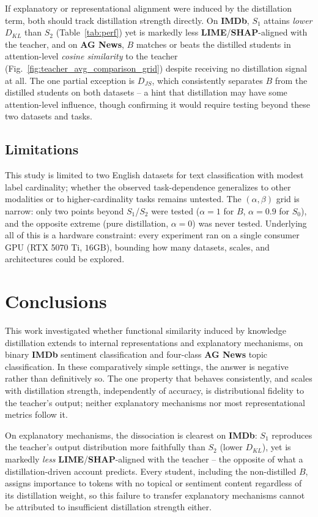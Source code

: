 \documentclass[conference]{IEEEtran}
\begin{document}
If explanatory or representational alignment were induced by the distillation term, both should track distillation strength directly. On \textbf{IMDb}, $S_1$ attains \emph{lower} $D_{KL}$ than $S_2$ (Table~\ref{tab:perf}) yet is markedly less \textbf{LIME}/\textbf{SHAP}-aligned with the teacher, and on \textbf{AG News}, $B$ matches or beats the distilled students in attention-level \textit{cosine similarity} to the teacher (Fig.~\ref{fig:teacher_avg_comparison_grid}) despite receiving no distillation signal at all. The one partial exception is $D_{JS}$, which consistently separates $B$ from the distilled students on both datasets -- a hint that distillation may have some attention-level influence, though confirming it would require testing beyond these two datasets and tasks.

\subsection{Limitations}\label{sec:limitations}

This study is limited to two English datasets for text classification with modest label cardinality; whether the observed task-dependence generalizes to other modalities or to higher-cardinality tasks remains untested. The $(\alpha,\beta)$ grid is narrow: only two points beyond $S_1$/$S_2$ were tested ($\alpha=1$ for $B$, $\alpha=0.9$ for $S_0$), and the opposite extreme (pure distillation, $\alpha=0$) was never tested. Underlying all of this is a hardware constraint: every experiment ran on a single consumer GPU (RTX 5070 Ti, $16$GB), bounding how many datasets, scales, and architectures could be explored.

\section{Conclusions}

This work investigated whether functional similarity induced by knowledge distillation extends to internal representations and explanatory mechanisms, on binary \textbf{IMDb} sentiment classification and four-class \textbf{AG News} topic classification. In these comparatively simple settings, the answer is negative rather than definitively so. The one property that behaves consistently, and scales with distillation strength, independently of accuracy, is distributional fidelity to the teacher's output; neither explanatory mechanisms nor most representational metrics follow it.

On explanatory mechanisms, the dissociation is clearest on \textbf{IMDb}: $S_1$ reproduces the teacher's output distribution more faithfully than $S_2$ (lower $D_{KL}$), yet is markedly \emph{less} \textbf{LIME}/\textbf{SHAP}-aligned with the teacher -- the opposite of what a distillation-driven account predicts. Every student, including the non-distilled $B$, assigns importance to tokens with no topical or sentiment content regardless of its distillation weight, so this failure to transfer explanatory mechanisms cannot be attributed to insufficient distillation strength either.
\end{document}
